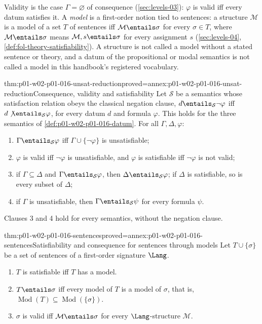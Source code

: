Validity is the case \(\Gamma=\varnothing\) of consequence
(\cref{sec:levels-03}): \(\varphi\) is valid iff every datum satisfies it.
A \emph{model} is a first-order notion tied to sentences: a structure
\(\mathcal M\) is a model of a set \(T\) of sentences iff
\(\mathcal M\entails\sigma\) for every \(\sigma\in T\), where
\(\mathcal M\entails\sigma\) means \(\mathcal M,s\entails\sigma\) for every
assignment \(s\) (\cref{sec:levels-04}, \cref{def:fol-theory-satisfiability}).
A structure is not called a model without a stated sentence or theory, and a
datum of the propositional or modal semantics is not called a model in this
handbook's registered vocabulary.

\begin{hbtheorem}{thm:p01-w02-p01-016-unsat-reduction}{proved=annex:p01-w02-p01-016-unsat-reduction}{Consequence, validity and satisfiability}
Let \(\mathcal S\) be a semantics whose satisfaction relation obeys the
classical negation clause, \(d\entails_{\mathcal S}\neg\varphi\) iff
\(d\not\entails_{\mathcal S}\varphi\), for every datum \(d\) and formula
\(\varphi\). This holds for the three semantics of
\cref{def:p01-w02-p01-016-datum}. For all \(\Gamma,\Delta,\varphi\):
\begin{enumerate}
  \item \(\Gamma\entails_{\mathcal S}\varphi\) iff
        \(\Gamma\cup\{\neg\varphi\}\) is unsatisfiable;
  \item \(\varphi\) is valid iff \(\neg\varphi\) is unsatisfiable, and
        \(\varphi\) is satisfiable iff \(\neg\varphi\) is not valid;
  \item if \(\Gamma\subseteq\Delta\) and \(\Gamma\entails_{\mathcal S}\varphi\),
        then \(\Delta\entails_{\mathcal S}\varphi\); if \(\Delta\) is
        satisfiable, so is every subset of \(\Delta\);
  \item if \(\Gamma\) is unsatisfiable, then
        \(\Gamma\entails_{\mathcal S}\psi\) for every formula \(\psi\).
\end{enumerate}
Clauses 3 and 4 hold for every semantics, without the negation clause.
\end{hbtheorem}

\begin{hbtheorem}{thm:p01-w02-p01-016-sentences}{proved=annex:p01-w02-p01-016-sentences}{Satisfiability and consequence for sentences through models}
Let \(T\cup\{\sigma\}\) be a set of sentences of a first-order signature
\(\Lang\).
\begin{enumerate}
  \item \(T\) is satisfiable iff \(T\) has a model.
  \item \(T\entails\sigma\) iff every model of \(T\) is a model of
        \(\sigma\), that is,
        \(\operatorname{Mod}(T)\subseteq\operatorname{Mod}(\{\sigma\})\).
  \item \(\sigma\) is valid iff \(\mathcal M\entails\sigma\) for every
        \(\Lang\)-structure \(\mathcal M\).
\end{enumerate}
\end{hbtheorem}


